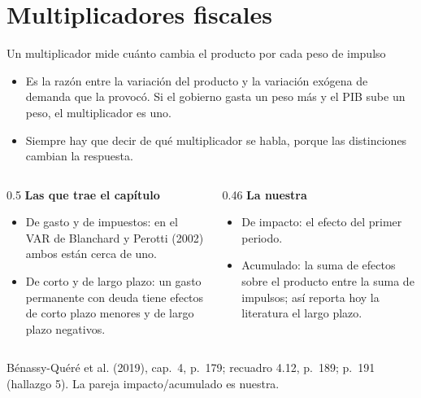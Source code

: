 \documentclass[aspectratio=169,11pt]{beamer}
\newcommand{\fuente}[1]{\par\vfill{\small\color{cGris}#1\par}}
\newcommand{\BQ}{Bénassy-Quéré et al. (2019), cap.~4}
\begin{document}
\section{Multiplicadores fiscales}

\begin{frame}{Un multiplicador mide cuánto cambia el producto por cada peso de impulso}
  \begin{itemize}
    \item Es la razón entre la variación del producto y la variación exógena de demanda que la provocó. Si el gobierno gasta un peso más y el PIB sube un peso, el multiplicador es uno.
    \item Siempre hay que decir de qué multiplicador se habla, porque las distinciones cambian la respuesta.
  \end{itemize}
  \pause
  \begin{columns}[T]
    \begin{column}{0.5\textwidth}
      \textbf{Las que trae el capítulo}
      \begin{itemize}
        \item De gasto y de impuestos: en el VAR de Blanchard y Perotti (2002) ambos están cerca de uno.
        \item De corto y de largo plazo: un gasto permanente con deuda tiene efectos de corto plazo menores y de largo plazo negativos.
      \end{itemize}
    \end{column}
    \begin{column}{0.46\textwidth}
      \textbf{La nuestra}
      \begin{itemize}
        \item De impacto: el efecto del primer periodo.
        \item Acumulado: la suma de efectos sobre el producto entre la suma de impulsos; así reporta hoy la literatura el largo plazo.
      \end{itemize}
    \end{column}
  \end{columns}
  \fuente{\BQ, p.~179; recuadro 4.12, p.~189; p.~191 (hallazgo 5). La pareja impacto/acumulado es nuestra.}
\end{frame}
\end{document}
